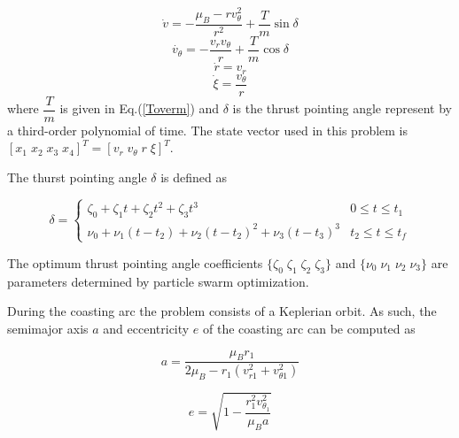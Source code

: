 \begin{equation}
    \dot{v} = -\dfrac{\mu_B-rv_\theta^2}{r^2}+\dfrac{T}{m}\sin\delta
    \label{vrdot_eom}
\end{equation}
\begin{equation}
\dot{v_\theta} = -\dfrac{v_rv_\theta}{r}+\dfrac{T}{m}\cos\delta
\label{vthetadot_eom}
\end{equation}
\begin{equation}
    \dot{r} = v_r
    \label{rdot_eom}
\end{equation}
\begin{equation}
    \label{xidot_eom}
\dot{\xi} = \dfrac{v_\theta}{r}
\end{equation}
where $\dfrac{T}{m}$ is given in Eq.(\ref{Toverm}) and $\delta$ is the thrust pointing angle represent by a
third-order polynomial of time. The state vector used in this problem is $[x_1 \; x_2 \; x_3 \; x_4]^T = [ v_r \; v_\theta \; r \; \xi ]^T$. \linebreak

\noindent The thurst pointing angle $\delta$ is defined as 

\begin{equation}
    \delta = 
    \begin{cases}
        \zeta_0 +\zeta_1t+\zeta_2t^2 +\zeta_3t^3 & 0 \leq t \leq t_1 \\
        \nu_0 + \nu_1(t-t_2) + \nu_2(t-t_2)^2+\nu_3(t-t_3)^3 & t_2 \leq t \leq t_f
    \end{cases}
    \label{delta_eq}
\end{equation} \linebreak

\noindent The optimum thrust pointing angle coefficients $\{\zeta_0 \; \zeta_1 \; \zeta_2 \; \zeta_3 \}$
and $\{\nu_0 \; \nu_1 \; \nu_2 \; \nu_3\}$ are parameters determined by particle swarm optimization. \newline

\noindent During the coasting arc the problem consists of a Keplerian orbit. As such, the semimajor axis $a$ and eccentricity $e$ of the coasting arc can be computed as

\begin{equation}
a = \dfrac{\mu_Br_1}{2\mu_B - r_1(v_{r1}^2+v_{\theta1}^2)}
\label{acoast}
\end{equation}

\begin{equation}
e = \sqrt{1-\dfrac{r_1^2v_{\theta_1}^2}{\mu_Ba}}
\label{ecoast}
\end{equation} \newline


